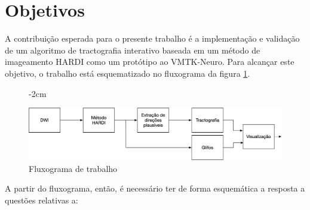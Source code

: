 \documentclass[
    12pt,                %
    oneside,            %
    a4paper,            %
    english,            %
    french,                %
    spanish,            %
    brazil                %
    ]{abntex2}
\begin{document}





\section{Objetivos}
\label{sec::objetivos}

A contribuição esperada para o presente trabalho é a implementação e validação de um algoritmo de tractografia interativo baseada em um método de imageamento HARDI como um protótipo ao VMTK-Neuro. Para alcançar este objetivo, o trabalho está esquematizado no fluxograma da figura \ref{fig::flowchart_trabalho_intro}.

\begin{figure}[ht]
   \centering
       \addtolength{\leftskip} {-2cm} %
    \addtolength{\rightskip}{-2cm}

    \centering
    \includegraphics[width=.9\linewidth, angle=0]{figs/Fluxogramas/flowchart_trabalho_intro.png}
    \caption{Fluxograma de trabalho}
    \label{fig::flowchart_trabalho_intro}
\end{figure}

A partir do fluxograma, então, é necessário ter de forma esquemática a resposta a questões relativas a:
\end{document}
